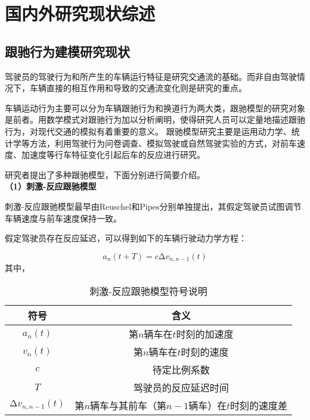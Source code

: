 \section{国内外研究现状综述}

\subsection{跟驰行为建模研究现状}

驾驶员的驾驶行为和所产生的车辆运行特征是研究交通流的基础。而非自由驾驶情况下，车辆直接的相互作用和导致的交通流变化则是研究的重点。

车辆运动行为主要可以分为车辆跟驰行为和换道行为两大类，跟驰模型的研究对象是前者。用数学模式对跟驰行为加以分析阐明，使得研究人员可以定量地描述跟驰行为，对现代交通的模拟有着重要的意义。
跟驰模型研究主要是运用动力学、统计学等方法，利用驾驶行为问卷调查、模拟驾驶或自然驾驶实验的方式，对前车速度、加速度等行车特征变化引起后车的反应进行研究。

研究者提出了多种跟驰模型，下面分别进行简要介绍。 \\

\noindent \textbf{（1）刺激-反应跟驰模型}

刺激-反应跟驰模型最早由Reuschel\cite{reuschel1950vehicle}和Pipes\cite{Pipes}分别单独提出，其假定驾驶员试图调节车辆速度与前车速度保持一致。

假定驾驶员存在反应延迟，可以得到如下的车辆行驶动力学方程：

\begin{equation}
  a_n(t+T) = c\increment{v_{n, n-1}}(t)
  \label{eq:chap01-1}
\end{equation}
其中，

\begin{table}
  \centering
  \caption{刺激-反应跟驰模型符号说明}
  \begin{tabular}{cc}
    \toprule
    符号          &  含义                         \\
    \midrule
    $a_n(t)$   & 第$n$辆车在$t$时刻的加速度         \\
    $v_n(t)$   & 第$n$辆车在$t$时刻的速度         \\
    $c$        & 待定比例系数                    \\
    $T$        & 驾驶员的反应延迟时间 \\
    $\increment{v_{n, n-1}}(t)$  &  第$n$辆车与其前车（第$n-1$辆车）在$t$时刻的速度差   \\
    \bottomrule
  \end{tabular}
  \label{tab:chap01-1}
\end{table}

